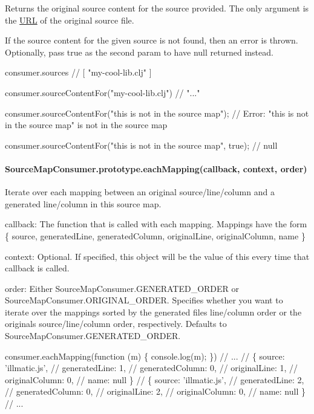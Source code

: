Returns the original source content for the source provided. The only argument is the \mbox{\hyperlink{namespace_u_r_l}{U\+RL}} of the original source file.

If the source content for the given source is not found, then an error is thrown. Optionally, pass {\ttfamily true} as the second param to have {\ttfamily null} returned instead.


\begin{DoxyCode}
consumer.sources
// [ "my-cool-lib.clj" ]

consumer.sourceContentFor("my-cool-lib.clj")
// "..."

consumer.sourceContentFor("this is not in the source map");
// Error: "this is not in the source map" is not in the source map

consumer.sourceContentFor("this is not in the source map", true);
// null
\end{DoxyCode}


\paragraph*{Source\+Map\+Consumer.\+prototype.\+each\+Mapping(callback, context, order)}

Iterate over each mapping between an original source/line/column and a generated line/column in this source map.


\begin{DoxyItemize}
\item {\ttfamily callback}\+: The function that is called with each mapping. Mappings have the form {\ttfamily \{ source, generated\+Line, generated\+Column, original\+Line, original\+Column, name \}}
\item {\ttfamily context}\+: Optional. If specified, this object will be the value of {\ttfamily this} every time that {\ttfamily callback} is called.
\item {\ttfamily order}\+: Either {\ttfamily Source\+Map\+Consumer.\+G\+E\+N\+E\+R\+A\+T\+E\+D\+\_\+\+O\+R\+D\+ER} or {\ttfamily Source\+Map\+Consumer.\+O\+R\+I\+G\+I\+N\+A\+L\+\_\+\+O\+R\+D\+ER}. Specifies whether you want to iterate over the mappings sorted by the generated file\textquotesingle{}s line/column order or the original\textquotesingle{}s source/line/column order, respectively. Defaults to {\ttfamily Source\+Map\+Consumer.\+G\+E\+N\+E\+R\+A\+T\+E\+D\+\_\+\+O\+R\+D\+ER}.
\end{DoxyItemize}


\begin{DoxyCode}
consumer.eachMapping(function (m) \{ console.log(m); \})
// ...
// \{ source: 'illmatic.js',
//   generatedLine: 1,
//   generatedColumn: 0,
//   originalLine: 1,
//   originalColumn: 0,
//   name: null \}
// \{ source: 'illmatic.js',
//   generatedLine: 2,
//   generatedColumn: 0,
//   originalLine: 2,
//   originalColumn: 0,
//   name: null \}
// ...
\end{DoxyCode}
